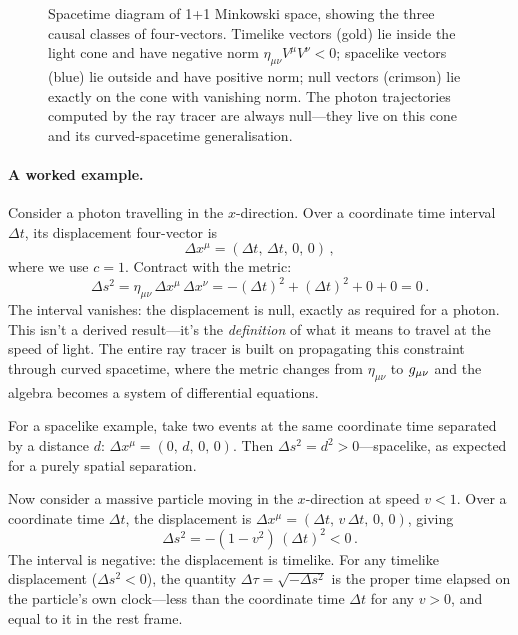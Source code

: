\begin{figure}[htbp]
  \centering
  
  \caption[Causal classes of four-vectors in Minkowski space]{Spacetime diagram of 1+1 Minkowski space, showing the three causal
    classes of four-vectors.  Timelike vectors (gold) lie inside the light cone
    and have negative norm $\eta_{\mu\nu} V^\mu V^\nu < 0$; spacelike vectors
    (blue) lie outside and have positive norm; null vectors (crimson) lie
    exactly on the cone with vanishing norm.  The photon trajectories computed
    by the ray tracer are always null---they live on this cone and its
    curved-spacetime generalisation.}
  \label{fig:minkowski-lightcone}
\end{figure}

\paragraph{A worked example.}

Consider a photon travelling in the $x$-direction.  Over a coordinate time
interval $\Delta t$, its displacement four-vector is
%
\begin{equation}
  \Delta x^\mu = (\Delta t,\, \Delta t,\, 0,\, 0) \,,
  \label{eq:photon-displacement}
\end{equation}
%
where we use $c = 1$.  Contract with the metric:
%
\begin{equation}
  \Delta s^2
    = \eta_{\mu\nu}\,\Delta x^\mu\, \Delta x^\nu
    = -(\Delta t)^2 + (\Delta t)^2 + 0 + 0
    = 0 \,.
  \label{eq:photon-interval}
\end{equation}
%
The interval vanishes: the displacement is null, exactly as required for a
photon.  This isn't a derived result---it's the \emph{definition} of what it
means to travel at the speed of light.  The entire ray tracer is built on
propagating this constraint through curved spacetime, where the metric changes
from $\eta_{\mu\nu}$ to $g_{\mu\nu}$ and the algebra becomes a system of
differential equations.

For a spacelike example, take two events at the same coordinate time separated
by a distance $d$: $\Delta x^\mu = (0,\, d,\, 0,\, 0)$.  Then $\Delta s^2 =
d^2 > 0$---spacelike, as expected for a purely spatial separation.

Now consider a massive particle moving in the $x$-direction at speed $v < 1$.
Over a coordinate time $\Delta t$, the displacement is $\Delta x^\mu = (\Delta
t,\, v\,\Delta t,\, 0,\, 0)$, giving
%
\begin{equation}
  \Delta s^2
    = -(1 - v^2)\,(\Delta t)^2
    < 0 \,.
  \label{eq:timelike-interval}
\end{equation}
%
The interval is negative: the displacement is timelike.  For any timelike
displacement ($\Delta s^2 < 0$), the quantity
$\Delta\tau = \sqrt{-\Delta s^2}$ is the proper time elapsed on the particle's
own clock---less than the coordinate time $\Delta t$ for any $v > 0$, and
equal to it in the rest frame.

